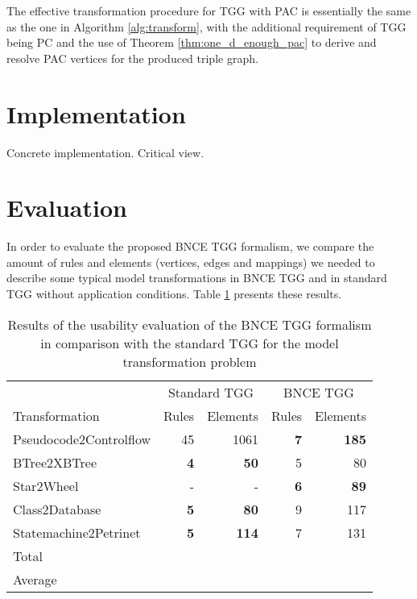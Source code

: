 \documentclass[]{report}
\begin{document}
The effective transformation procedure for TGG with PAC is essentially the same as the one in Algorithm \ref{alg:transform}, with the additional requirement of TGG being PC and the use of Theorem \ref{thm:one_d_enough_pac} to derive and resolve PAC vertices for the produced triple graph.

\section{Implementation}
Concrete implementation. Critical view.

\section{Evaluation}
In order to evaluate the proposed BNCE TGG formalism, we compare the amount of rules and elements (vertices, edges and mappings) we needed to describe some typical model transformations in BNCE TGG and in standard TGG without application conditions. Table \ref{tab:formalism-eval} presents these results.
\begin{table}[h]
	\centering
	\begin{tabular}{l r r r r }
						& \multicolumn{2}{c}{Standard TGG} & \multicolumn{2}{c}{BNCE TGG}\\
		Transformation 			& Rules & Elements 	& Rules & Elements\\
		\hline
		Pseudocode2Controlflow	& 45			& 1061	& \textbf{7}	& \textbf{185} \\
		BTree2XBTree			& \textbf{4}	& \textbf{50}	& 5		& 80 \\
		Star2Wheel				& -				& -		& \textbf{6} 	& \textbf{89} \\
		Class2Database			& \textbf{5}	& \textbf{80}	& 9 	& 117  \\
		Statemachine2Petrinet	& \textbf{5}	& \textbf{114}	& 7		& 131 \\
		
		\hline
		Total					&  & 		&	& \\
		Average					&  & 		&	& \\
	\end{tabular}
	\caption{Results of the usability evaluation of the BNCE TGG formalism in comparison with the standard TGG for the model transformation problem}
	\label{tab:formalism-eval}
\end{table}
\end{document}
